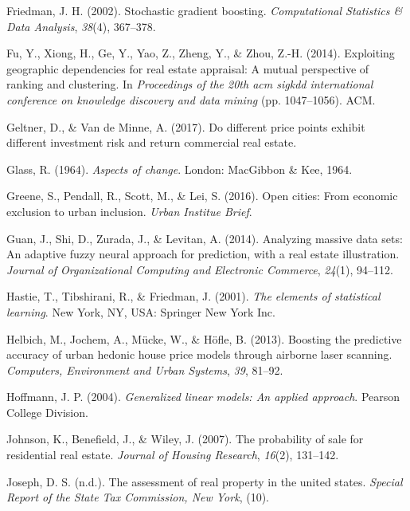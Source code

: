 \documentclass[12pt,]{article}
\begin{document}
\leavevmode\hypertarget{ref-friedman2002stochastic}{}%
Friedman, J. H. (2002). Stochastic gradient boosting.
\emph{Computational Statistics \& Data Analysis}, \emph{38}(4),
367--378.

\leavevmode\hypertarget{ref-Fu2014}{}%
Fu, Y., Xiong, H., Ge, Y., Yao, Z., Zheng, Y., \& Zhou, Z.-H. (2014).
Exploiting geographic dependencies for real estate appraisal: A mutual
perspective of ranking and clustering. In \emph{Proceedings of the 20th
acm sigkdd international conference on knowledge discovery and data
mining} (pp. 1047--1056). ACM.

\leavevmode\hypertarget{ref-Geltner2017}{}%
Geltner, D., \& Van de Minne, A. (2017). Do different price points
exhibit different investment risk and return commercial real estate.

\leavevmode\hypertarget{ref-glass1964}{}%
Glass, R. (1964). \emph{Aspects of change}. London: MacGibbon \& Kee,
1964.

\leavevmode\hypertarget{ref-urban2016}{}%
Greene, S., Pendall, R., Scott, M., \& Lei, S. (2016). Open cities: From
economic exclusion to urban inclusion. \emph{Urban Institue Brief}.

\leavevmode\hypertarget{ref-Guan2014}{}%
Guan, J., Shi, D., Zurada, J., \& Levitan, A. (2014). Analyzing massive
data sets: An adaptive fuzzy neural approach for prediction, with a real
estate illustration. \emph{Journal of Organizational Computing and
Electronic Commerce}, \emph{24}(1), 94--112.

\leavevmode\hypertarget{ref-hastie01statisticallearning}{}%
Hastie, T., Tibshirani, R., \& Friedman, J. (2001). \emph{The elements
of statistical learning}. New York, NY, USA: Springer New York Inc.

\leavevmode\hypertarget{ref-Helbich2013}{}%
Helbich, M., Jochem, A., Mücke, W., \& Höfle, B. (2013). Boosting the
predictive accuracy of urban hedonic house price models through airborne
laser scanning. \emph{Computers, Environment and Urban Systems},
\emph{39}, 81--92.

\leavevmode\hypertarget{ref-hoffmann2004generalized}{}%
Hoffmann, J. P. (2004). \emph{Generalized linear models: An applied
approach}. Pearson College Division.

\leavevmode\hypertarget{ref-Johnson2007}{}%
Johnson, K., Benefield, J., \& Wiley, J. (2007). The probability of sale
for residential real estate. \emph{Journal of Housing Research},
\emph{16}(2), 131--142.

\leavevmode\hypertarget{ref-Silverherz1936}{}%
Joseph, D. S. (n.d.). The assessment of real property in the united
states. \emph{Special Report of the State Tax Commission, New York},
(10).
\end{document}
